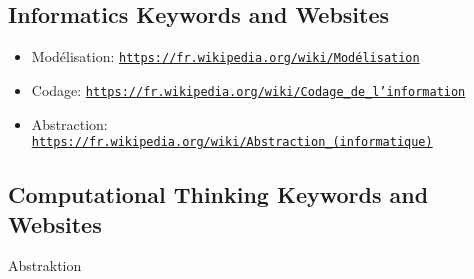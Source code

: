 \documentclass[a4paper,11pt]{report}
\newcommand{\BrochureUrlText}[1]{\texttt{#1}}
\begin{document}
\subsection*{Informatics Keywords and Websites}

\begin{itemize}
  \item Modélisation: \href{https://fr.wikipedia.org/wiki/Mod\%C3\%A9lisation}{\BrochureUrlText{https://fr.wikipedia.org/wiki/Modélisation}}
  \item Codage: \href{https://fr.wikipedia.org/wiki/Codage_de_l\%27information}{\BrochureUrlText{https://fr.wikipedia.org/wiki/Codage\_de\_l'information}}
  \item Abstraction: \href{https://fr.wikipedia.org/wiki/Abstraction_(informatique)}{\BrochureUrlText{https://fr.wikipedia.org/wiki/Abstraction\_(informatique)}}
\end{itemize}


\subsection*{Computational Thinking Keywords and Websites}

Abstraktion
\end{document}
